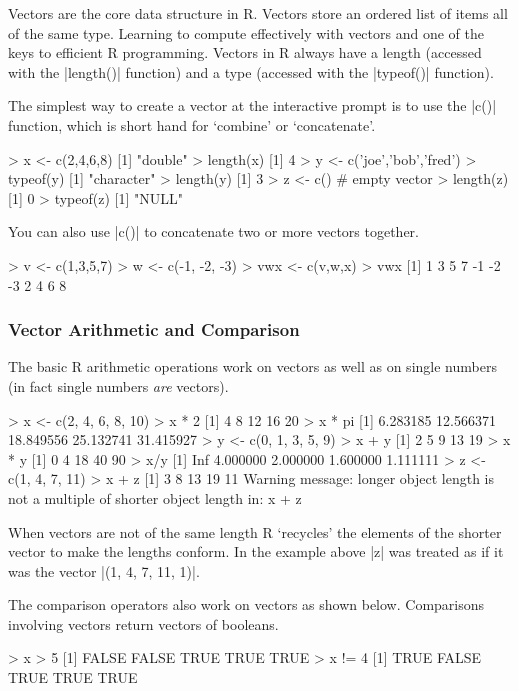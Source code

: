 Vectors are the core data structure in R. Vectors store an ordered list of items all of the same type. Learning to compute effectively with vectors and one of the keys to efficient R programming.  Vectors in R always have a length (accessed with the |length()| function) and a type (accessed with the |typeof()| function).  

The simplest way to create a vector at the interactive prompt is to use the |c()| function, which is short hand for `combine' or `concatenate'.

\begin{R}
> x <- c(2,4,6,8)
[1] "double"
> length(x)
[1] 4
> y <- c('joe','bob','fred')
> typeof(y)
[1] "character"
> length(y)
[1] 3
> z <- c() # empty vector
> length(z)
[1] 0
> typeof(z)
[1] "NULL"
\end{R}

You can also use |c()| to concatenate two or more vectors together.
%
\begin{R}
> v <- c(1,3,5,7)
> w <- c(-1, -2, -3)
> vwx <- c(v,w,x)
> vwx
 [1]  1  3  5  7 -1 -2 -3  2  4  6  8
\end{R}

\subsubsection{Vector Arithmetic and Comparison}

The basic R arithmetic operations work on vectors as well as on
single numbers (in fact single numbers \emph{are} vectors).
%
\begin{R}
> x <- c(2, 4, 6, 8, 10)
> x * 2
[1]  4  8 12 16 20
> x * pi
[1]  6.283185 12.566371 18.849556 25.132741 31.415927
> y <- c(0, 1, 3, 5, 9)
> x + y
[1]  2  5  9 13 19
> x * y
[1]  0  4 18 40 90
> x/y
[1]      Inf 4.000000 2.000000 1.600000 1.111111
> z <- c(1, 4, 7, 11)
> x + z
[1]  3  8 13 19 11
Warning message:
longer object length
        is not a multiple of shorter object length in: x + z
\end{R}
%
When vectors are not of the same length R `recycles' the elements of the
shorter vector to make the lengths conform. In the example above
|z| was treated as if it was the vector |(1, 4, 7, 11, 1)|.


The comparison operators also work on vectors as shown below.
Comparisons involving vectors return vectors of booleans.
%
\begin{R}
> x > 5
[1] FALSE FALSE  TRUE  TRUE  TRUE
> x != 4
[1]  TRUE FALSE  TRUE  TRUE  TRUE
\end{R}

